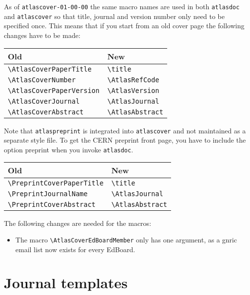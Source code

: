 \documentclass[koma,UKenglish]{style/atlasdoc}
\newcommand{\Macro}[1]{\texttt{\textbackslash #1}\xspace}
\newcommand{\Option}[1]{\textsf{#1}\xspace}
\newcommand{\Package}[1]{\texttt{#1}\xspace}
\begin{document}
As of \texttt{atlascover-01-00-00} the same macro names are used in both \texttt{atlasdoc} and
\texttt{atlascover} so that title, journal and version number only need to be specified once.
This means that if you start from an old cover page the following changes have to be made:
\begin{center}
	\begin{tabular}{ll}
		Old                            & New                   \\
		\midrule
		\Macro{AtlasCoverPaperTitle}   & \Macro{title}    \\
		\Macro{AtlasCoverNumber}       & \Macro{AtlasRefCode}  \\
		\Macro{AtlasCoverPaperVersion} & \Macro{AtlasVersion}  \\
		\Macro{AtlasCoverJournal}      & \Macro{AtlasJournal}  \\
		\Macro{AtlasCoverAbstract}     & \Macro{AtlasAbstract}
	\end{tabular}
\end{center}

Note that \texttt{atlaspreprint} is integrated into \texttt{atlascover} and not maintained as a separate style file.
To get the CERN preprint front page, you have to include the option \Option{preprint} when you invoke \Package{atlasdoc}.
\begin{center}
	\begin{tabular}{ll}
		Old                              & New                   \\
		\midrule
		\Macro{PreprintCoverPaperTitle} & \Macro{title}    \\
		\Macro{PreprintJournalName}     & \Macro{AtlasJournal}  \\
		\Macro{PreprintCoverAbstract}   & \Macro{AtlasAbstract}
	\end{tabular}
\end{center}
The following changes are needed for the macros:
\begin{itemize}
\item The macro \Macro{AtlasCoverEdBoardMember} only has one argument, as a gnric email list now exists for every EdBoard.
\end{itemize}


\section{Journal templates}
\label{sec:journal}
\end{document}
